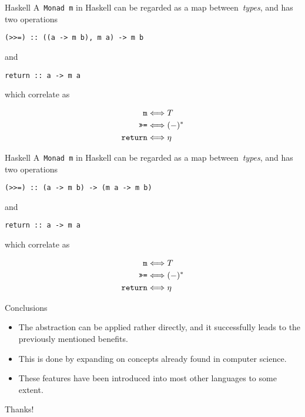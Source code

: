 \documentclass{beamer}
\begin{document}
\begin{frame}[fragile]{Haskell}
    A~\texttt{Monad m} in Haskell can be regarded as a map
    between~\emph{types}, and has two operations
    \begin{verbatim}
(>>=) :: ((a -> m b), m a) -> m b
    \end{verbatim}
    and
    \begin{verbatim}
return :: a -> m a
    \end{verbatim}
    which correlate as

    \begin{align*}
        \text{\texttt{m}} &\Longleftrightarrow T \\
        \text{\texttt{>>=}} &\Longleftrightarrow (-)^{\ast} \\
        \text{\texttt{return}} &\Longleftrightarrow \eta
    \end{align*}
\end{frame}

\begin{frame}[fragile]{Haskell}
    A~\texttt{Monad m} in Haskell can be regarded as a map
    between~\emph{types}, and has two operations
    \begin{verbatim}
(>>=) :: (a -> m b) -> (m a -> m b)
    \end{verbatim}
    and
    \begin{verbatim}
return :: a -> m a
    \end{verbatim}
    which correlate as

    \begin{align*}
        \text{\texttt{m}} &\Longleftrightarrow T \\
        \text{\texttt{>>=}} &\Longleftrightarrow (-)^{\ast} \\
        \text{\texttt{return}} &\Longleftrightarrow \eta
    \end{align*}
\end{frame}

\begin{frame}{Conclusions}
    \begin{itemize}
        \item The abstraction can be applied rather directly, and it
            successfully leads to the previously mentioned benefits.

            \pause

        \item This is done by expanding on concepts already found in computer
            science.

            \pause

        \item These features have been introduced into most other languages to
            some extent.
    \end{itemize}
\end{frame}

\begin{frame}
    \begin{center}
        \Huge Thanks!
    \end{center}
\end{frame}
\end{document}

